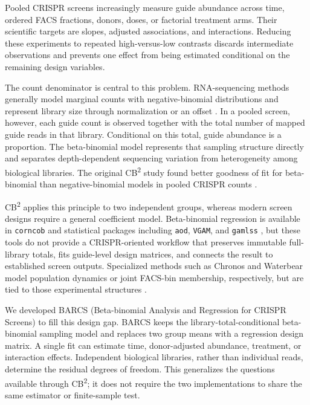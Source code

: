 Pooled CRISPR screens increasingly measure guide abundance across time,
ordered FACS fractions, donors, doses, or factorial treatment arms.  Their
scientific targets are slopes, adjusted associations, and interactions.
Reducing these experiments to repeated high-versus-low contrasts discards
intermediate observations and prevents one effect from being estimated
conditional on the remaining design variables.

The count denominator is central to this problem.  RNA-sequencing methods
generally model marginal counts with negative-binomial distributions and
represent library size through normalization or an offset
\citep{marioni2008rnaseq,anders2010deseq,love2014deseq2,law2014voom,
lun2016edger}.  In a pooled
screen, however, each guide count is observed together with the total number
of mapped guide reads in that library.  Conditional on this total, guide
abundance is a proportion.  The beta-binomial model represents that sampling
structure directly and separates depth-dependent sequencing variation from
heterogeneity among biological libraries.  The original
CB\textsuperscript{2} study found better goodness of fit for beta-binomial than
negative-binomial models in pooled CRISPR counts \citep{jeong2019beta}.

CB\textsuperscript{2} applies this principle to two independent groups, whereas
modern screen designs require a general coefficient model.  Beta-binomial
regression is available in \texttt{corncob} and statistical packages including
\texttt{aod}, \texttt{VGAM}, and \texttt{gamlss}
\citep{martin2020corncob,lesnoff2012aod,yee1996vgam,rigby2005gamlss}, but these
tools do not provide a CRISPR-oriented workflow that preserves immutable
full-library totals, fits guide-level design matrices, and
connects the result to established screen outputs.  Specialized methods such
as Chronos and Waterbear model population dynamics or joint FACS-bin
membership, respectively, but are tied to those experimental structures
\citep{dempster2021chronos,pimentel2024waterbear}.

We developed BARCS (Beta-binomial Analysis and Regression for CRISPR Screens)
to fill this design gap.  BARCS keeps the library-total-conditional
beta-binomial sampling model and replaces two group means with a regression
design matrix.  A single fit can estimate time, donor-adjusted abundance,
treatment, or interaction effects.  Independent biological libraries, rather
than individual reads, determine the residual degrees of freedom.  This
generalizes the questions available through CB\textsuperscript{2}; it does not
require the two implementations to share the same estimator or finite-sample
test.

